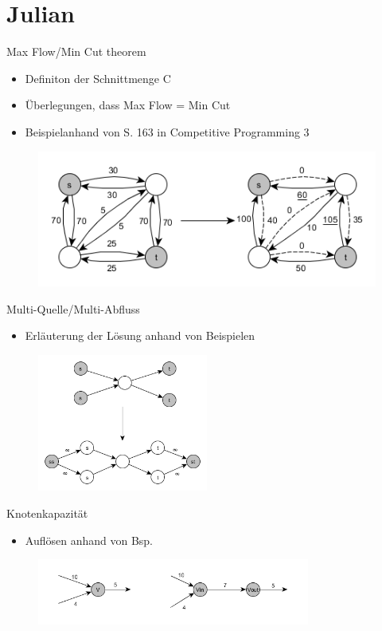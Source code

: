 \documentclass[18pt]{beamer}
\begin{document}
\section{Julian}
\begin{frame}{Max Flow/Min Cut theorem}
	\begin{itemize}
		\item Definiton der Schnittmenge C
		\item \"Uberlegungen, dass Max Flow = Min Cut
		\item Beispielanhand von S. 163 in Competitive Programming 3
	\end{itemize}
	\begin{figure}
		\includegraphics[width = \textwidth]{img/Julian_MaxMin.jpg}
	\end{figure}
\end{frame}

\begin{frame}{Multi-Quelle/Multi-Abfluss}
	\begin{itemize}
		\item Erl\"auterung der L\"osung anhand von Beispielen
	\end{itemize}
	\begin{figure}
		\includegraphics[width = 0.5\textwidth]{img/Julian_Multi.jpg}
	\end{figure}
\end{frame}


\begin{frame}{Knotenkapazit\"at}
	\begin{itemize}
		\item Aufl\"osen anhand von Bsp.
	\end{itemize}
	\begin{figure}
		\includegraphics[width = 0.8\textwidth] {img/Julian_Kapazitaet.jpg}
	\end{figure}
\end{frame}
\end{document}
